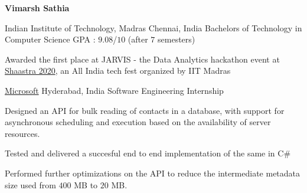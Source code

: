 \documentclass[10pt]{article}
\begin{document}
	
\begin{center}
	\textbf{\LARGE Vimarsh Sathia}\\
\end{center}

\spacedhrule{-1.0ex}{-0.5ex}

	\headedsection
	{Indian Institute of Technology, Madras}
	{Chennai, India}
	{Bachelors of Technology in Computer Science}
	{}
	{GPA : $9.08$/$10$ (after $7$ semesters)}

\spacedhrule{0.8ex}{0.0ex}

\begin{circlist}
	\item Awarded the first place at JARVIS - the Data Analytics hackathon event at \href{https://en.wikipedia.org/wiki/Shaastra}{Shaastra 2020}, an All India tech fest organized by IIT Madras
\end{circlist}

\spacedhrule{0.8ex}{0.0ex}
	
\headedsection
{\href{https://www.microsoft.com/en-in/}{Microsoft}}
{Hyderabad, India}
{Software Engineering Internship}
{}
{
	\vspace{-2.4ex}
	\begin{circlist}
		\item Designed an API for bulk reading of contacts in a database, with support for asynchronous scheduling and execution based on the availability of server resources.
		\item Tested and delivered a succesful end to end implementation of the same in C\#
		\item Performed further optimizations on the API to reduce the intermediate metadata size used from $400$ MB to $20$ MB.
	\end{circlist}
}
\end{document}
